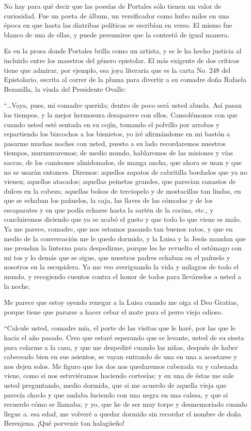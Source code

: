 \documentclass[10pt,twoside,openright]{memoir}
\begin{document}
No hay para qué decir que las poesías de Portales sólo tienen un valor
de curiosidad. Fue un poeta de álbum, un versificador como hubo miles en
una época en que hasta las diatribas políticas se escribían en verso. El
mismo fue blanco de una de ellas, y puede presumirse que la contestó de
igual manera.

Es en la prosa donde Portales brilla como un artista, y se le ha hecho
justicia al incluirlo entre los maestros del género epistolar. El más
exigente de dos críticos tiene que admirar, por ejemplo, esa joya
literaria que es la carta No. 248 del Epistolario, escrita al correr de
la pluma para divertir a su comadre doña Rafaela Bezanilla, la viuda del
Presidente Ovalle:

``\ldots{}Vaya, pues, mi comadre querida; dentro de poco será usted
abuela. Así pasan los tiempos, y la mejor hermosura desaparece con
ellos. Consolémonos con que cuando usted esté sentada en su cojín,
tomando el polvillo por arrobas y repartiendo los bizcochos a los
bisnietos, yo iré afirmándome en mi bastón a pasarme muchas noches con
usted, puesto a su lado recordaremos nuestros tiempos, murmuraremos; de
medio mundo, hablaremos de las misiones y vías sacras, de los camisones
almidonados, de manga ancha, que ahora se usan y que no se usarán
entonces. Diremos: aquellos zapatos de cabritilla bordados que ya no
vienen; aquellos atacados; aquellas peinetas grandes, que parecían
canastos de dulces en la cabeza; aquellas bolsas de terciopelo y de
mostacillas tan lindas, en que se echaban los pañuelos, la caja, las
llaves de las cómodas y de los escaparates y en que podía echarse hasta
la sartén de la cocina, etc., y concluiremos diciendo que ya se acabó el
gusto y que todo lo que viene es malo. Ya me parece, comadre, que nos
estamos pasando tan buenos ratos, y que en medio de la conversación me
le quedo dormido, y la Luisa y la Jesús mandan que me prendan la
linterna para despedirme, porque les he revuelto el estómago con mi tos
y lo demás que se sigue, que nuestros padres echaban en el pañuelo y
nosotros en la escupidera. Ya me veo averiguando la vida y milagros de
todo el mundo, y recogiendo cuentos contra el honor de todos para
llevárselos a usted a la noche.

Me parece que estoy oyendo renegar a la Luisa cuando me oiga el Deo
Gratias, porque tiene que pararse a hacer cebar el mate para el perro
viejo odioso.

``Calcule usted, comadre mía, el porte de las visitas que le haré, por
las que le hacía el año pasado. Creo que estaré esperando que se
levante, usted de su siesta para colarme a la casa, y que me despediré
cuando las niñas, después de haber cabeceado bien en sus asientos, se
vayan entrando de una en una a acostarse y nos dejen solos. Me figuro
que los dos nos quedaremos cabezada va y cabezada viene, como si nos
estuviéramos haciendo cortesías; y en una de éstas me sale usted
preguntando, medio dormida, que si me acuerdo de aquella vieja que
parecía choclo y que andaba luciendo con una negra en una calesa, y que
si recuerdo cómo se llamaba; y yo, que he de ser muy torpe y
desmemoriado cuando llegue a. esa edad, me volveré a quedar dormido sin
recordar el nombre de doña Berenjena. ¡Qué porvenir tan halagüeño!
\end{document}
